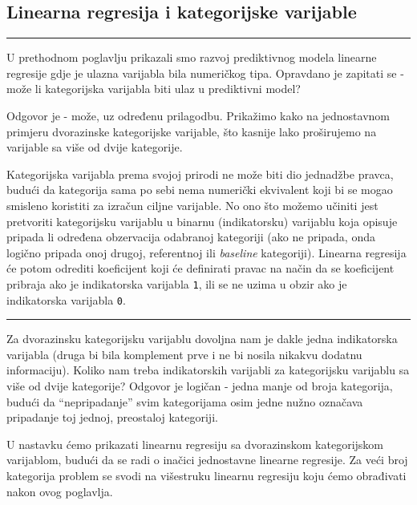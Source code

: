 \documentclass[]{book}
\theoremstyle{definition}
\theoremstyle{definition}
\theoremstyle{definition}
\theoremstyle{remark}
\begin{document}
\subsection{Linearna regresija i kategorijske
varijable}\label{linearna-regresija-i-kategorijske-varijable}

\begin{center}\rule{0.5\linewidth}{\linethickness}\end{center}

U prethodnom poglavlju prikazali smo razvoj prediktivnog modela linearne
regresije gdje je ulazna varijabla bila numeričkog tipa. Opravdano je
zapitati se - može li kategorijska varijabla biti ulaz u prediktivni
model?

Odgovor je - može, uz određenu prilagodbu. Prikažimo kako na
jednostavnom primjeru dvorazinske kategorijske varijable, što kasnije
lako proširujemo na varijable sa više od dvije kategorije.

Kategorijska varijabla prema svojoj prirodi ne može biti dio jednadžbe
pravca, budući da kategorija sama po sebi nema numerički ekvivalent koji
bi se mogao smisleno koristiti za izračun ciljne varijable. No ono što
možemo učiniti jest pretvoriti kategorijsku varijablu u binarnu
(indikatorsku) varijablu koja opisuje pripada li određena obzervacija
odabranoj kategoriji (ako ne pripada, onda logično pripada onoj drugoj,
referentnoj ili \emph{baseline} kategoriji). Linearna regresija će potom
odrediti koeficijent koji će definirati pravac na način da se
koeficijent pribraja ako je indikatorska varijabla \texttt{1}, ili se ne
uzima u obzir ako je indikatorska varijabla \texttt{0}.

\begin{center}\rule{0.5\linewidth}{\linethickness}\end{center}

Za dvorazinsku kategorijsku varijablu dovoljna nam je dakle jedna
indikatorska varijabla (druga bi bila komplement prve i ne bi nosila
nikakvu dodatnu informaciju). Koliko nam treba indikatorskih varijabli
za kategorijsku varijablu sa više od dvije kategorije? Odgovor je
logičan - jedna manje od broja kategorija, budući da ``nepripadanje''
svim kategorijama osim jedne nužno označava pripadanje toj jednoj,
preostaloj kategoriji.

U nastavku ćemo prikazati linearnu regresiju sa dvorazinskom
kategorijskom varijablom, budući da se radi o inačici jednostavne
linearne regresije. Za veći broj kategorija problem se svodi na
višestruku linearnu regresiju koju ćemo obrađivati nakon ovog poglavlja.
\end{document}
